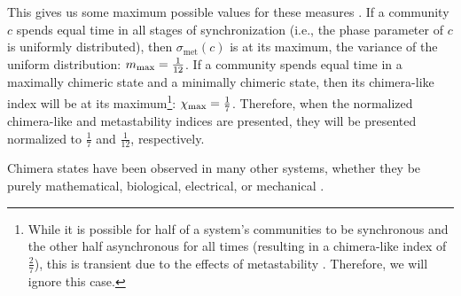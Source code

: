 This gives us some maximum possible values for these measures \cite{Shanahan2010}.
If a community $c$ spends equal time in all stages of synchronization (i.e., the phase parameter of $c$ is uniformly distributed), then $\sigma_{\text{met}}(c)$ is at its maximum, the variance of the uniform distribution: $m_{\text{max}} = \frac{1}{12}$.
If a community spends equal time in a maximally chimeric state and a minimally chimeric state, then its chimera-like index will be at its maximum\footnote{While it is possible for half of a system's communities to be synchronous and the other half asynchronous for all times (resulting in a chimera-like index of $\frac{2}{7}$), this is transient due to the effects of metastability \cite{Shanahan2010}.  Therefore, we will ignore this case.}: $\chi_{\text{max}} = \frac{1}{7}$.
Therefore, when the normalized chimera-like and metastability indices are presented, they will be presented normalized to $\frac{1}{7}$ and $\frac{1}{12}$, respectively.

Chimera states have been observed in many other systems, whether they be purely mathematical, biological, electrical, or mechanical \cite{Shanahan2010,Abrams2004,Andrzejak2016,Hizanidis2016,Kuramoto2002,Martens2013,Panaggio2015,Santos2015,Santos2017,Kruk2018,Xie2014}.

